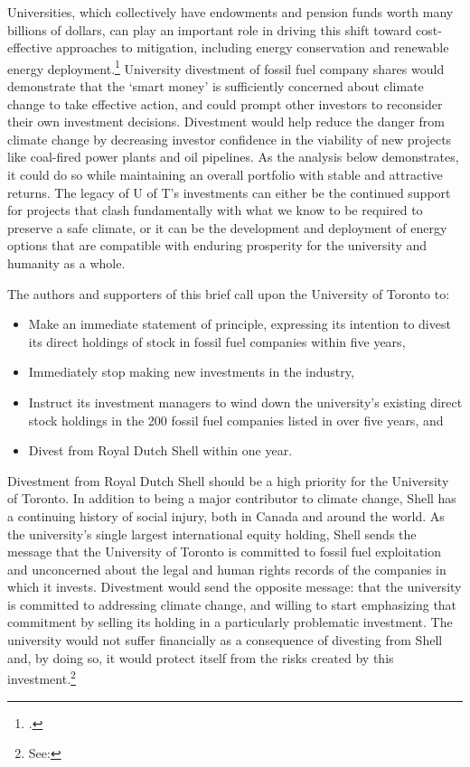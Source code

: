 Universities, which collectively have endowments and pension funds worth many billions of dollars, can play an important role in driving this shift toward cost-effective approaches to  mitigation, including energy conservation and renewable energy deployment.\footcite[The consultancy McKinsey \& Company has studied and ranked global options for mitigating GHG pollution, considering their cost, plausible deployment speed, and the scale at which they can help solve the problem. See: ][p. 8]{McKinseyCurve}
University divestment of fossil fuel company shares would demonstrate that the `smart money' is sufficiently concerned about climate change to take effective action, and could prompt other investors to reconsider their own investment decisions. 
Divestment would help reduce the danger from climate change by decreasing investor confidence in the viability of new projects like coal-fired power plants and oil pipelines.
As the analysis below demonstrates, it could do so while maintaining an overall portfolio with stable and attractive returns.
The legacy of U of T's investments can either be the continued support for projects that clash fundamentally with what we know to be required to preserve a safe climate, or it can be the development and deployment of energy options that are compatible with enduring prosperity for the university and humanity as a whole.



The authors and supporters of this brief call upon the University of Toronto to:
\begin{itemize}
	\item Make an immediate statement of principle, expressing its intention to divest its direct holdings of stock in fossil fuel companies within five years,
	\item Immediately stop making new investments in the industry,
	\item Instruct its investment managers to wind down the university's existing direct stock holdings in the 200 fossil fuel companies listed in  over five years, and
	\item Divest from Royal Dutch Shell within one year.
\end{itemize}



Divestment from Royal Dutch Shell should be a high priority for the University of Toronto. 
In addition to being a major contributor to climate change, Shell has a continuing history of social injury, both in Canada and around the world. 
As the university's single largest international equity holding, Shell sends the message that the University of Toronto is committed to fossil fuel exploitation and unconcerned about the legal and human rights records of the companies in which it invests. 
Divestment would send the opposite message: that the university is committed to addressing climate change, and willing to start emphasizing that commitment by selling its holding in a particularly problematic investment.  
The university would not suffer financially as a consequence of divesting from Shell and, by doing so, it would protect itself from the risks created by this investment.\footnote{See: }



